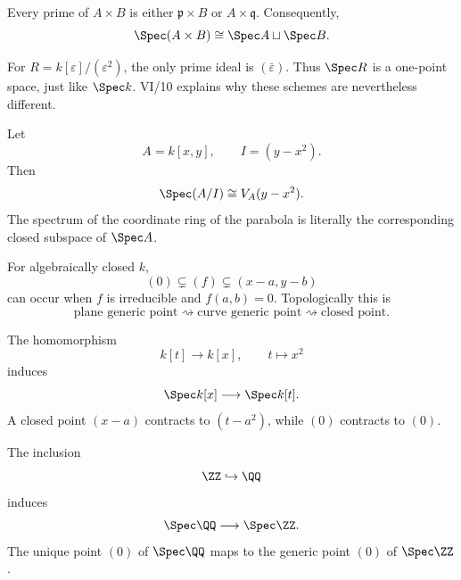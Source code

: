 \begin{example}
Every prime of $A\times B$ is either $\mathfrak p\times B$ or $A\times\mathfrak q$.
Consequently,
\[
\Spec(A\times B)\cong\Spec A\sqcup\Spec B.
\]
\end{example}

\begin{example}
For $R=k[\varepsilon]/(\varepsilon^2)$, the only prime ideal is $(\bar\varepsilon)$.
Thus $\Spec R$ is a one-point space, just like $\Spec k$.  VI/10 explains why these
schemes are nevertheless different.
\end{example}

\begin{example}
Let
\[
A=k[x,y],\qquad I=(y-x^2).
\]
Then
\[
\Spec(A/I)\cong V_A(y-x^2).
\]
The spectrum of the coordinate ring of the parabola is literally the corresponding
closed subspace of $\Spec A$.
\end{example}

\begin{example}
For algebraically closed $k$,
\[
(0)\subsetneq (f)\subsetneq(x-a,y-b)
\]
can occur when $f$ is irreducible and $f(a,b)=0$.  Topologically this is
\[
\text{plane generic point}\rightsquigarrow
\text{curve generic point}\rightsquigarrow
\text{closed point}.
\]
\end{example}

\begin{example}
The homomorphism
\[
k[t]\longrightarrow k[x],\qquad t\longmapsto x^2
\]
induces
\[
\Spec k[x]\longrightarrow\Spec k[t].
\]
A closed point $(x-a)$ contracts to $(t-a^2)$, while $(0)$ contracts to $(0)$.
\end{example}

\begin{example}
The inclusion
\[
\ZZ\hookrightarrow\QQ
\]
induces
\[
\Spec\QQ\longrightarrow\Spec\ZZ.
\]
The unique point $(0)$ of $\Spec\QQ$ maps to the generic point $(0)$ of $\Spec\ZZ$.
\end{example}
